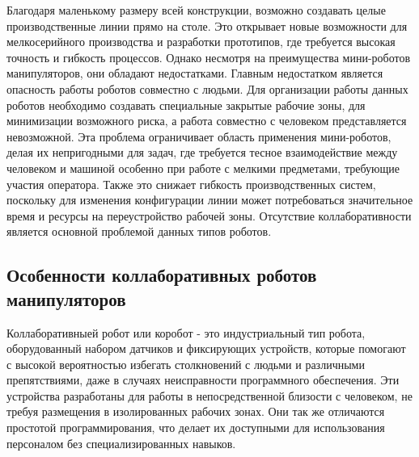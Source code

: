 Благодаря маленькому размеру всей конструкции, возможно создавать целые производственные линии прямо на столе. Это открывает новые возможности для мелкосерийного производства и разработки прототипов, где требуется высокая точность и гибкость процессов. Однако несмотря на преимущества мини-роботов манипуляторов, они обладают недостатками. Главным недостатком является опасность работы роботов совместно с людьми. Для организации работы данных роботов необходимо создавать специальные закрытые рабочие зоны, для минимизации возможного риска, а работа совместно с человеком представляется невозможной.
Эта проблема ограничивает область применения мини-роботов, делая их непригодными для задач, где требуется тесное взаимодействие между человеком и машиной особенно при работе с мелкими предметами, требующие участия оператора. Также это снижает гибкость производственных систем, поскольку для изменения конфигурации линии может потребоваться значительное время и ресурсы на переустройство рабочей зоны. Отсутствие коллаборативности является основной проблемой данных типов роботов.


\subsection{Особенности коллаборативных роботов манипуляторов}

Коллаборативныей робот или коробот - это индустриальный тип робота, оборудованный набором датчиков и фиксирующих устройств, которые помогают с высокой вероятностью избегать столкновений с людьми и различными препятствиями, даже в случаях неисправности программного обеспечения. Эти устройства разработаны для работы в непосредственной близости с человеком, не требуя размещения в изолированных рабочих зонах. Они так же отличаются простотой программирования, что делает их доступными для использования персоналом без специализированных навыков.

